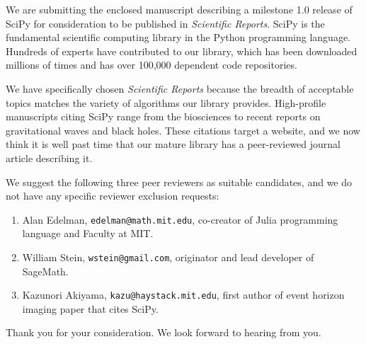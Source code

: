 \documentclass[10pt,stdletter,dateno]{newlfm}
\begin{document}
\begin{newlfm}

We are submitting the enclosed manuscript describing a milestone
1.0 release of SciPy for consideration to be published in
\emph{Scientific Reports}. SciPy is the fundamental scientific 
computing library in the Python programming language. 
Hundreds of experts have contributed to our library, which
has been downloaded millions of times and has over 100,000 dependent
code repositories.

We have specifically chosen \emph{Scientific Reports} because
the breadth of acceptable topics matches the variety of algorithms
our library provides. High-profile manuscripts citing SciPy range
from the biosciences to recent reports on gravitational waves and
black holes. These citations target a website, and we now think
it is well past time that our mature library has a peer-reviewed
journal article describing it.

We suggest the following three peer reviewers as suitable candidates,
and we do not have any specific reviewer exclusion requests:

\begin{enumerate}
    \item Alan Edelman, \texttt{edelman@math.mit.edu}, co-creator of Julia
    programming language and Faculty at MIT.
    \item William Stein, \texttt{wstein@gmail.com}, originator and
    lead developer of SageMath.
    \item Kazunori Akiyama, \texttt{kazu@haystack.mit.edu}, first author
    of event horizon imaging paper that cites SciPy.
\end{enumerate}

Thank you for your consideration.  We look forward to
hearing from you.

\end{newlfm}
\end{document}
